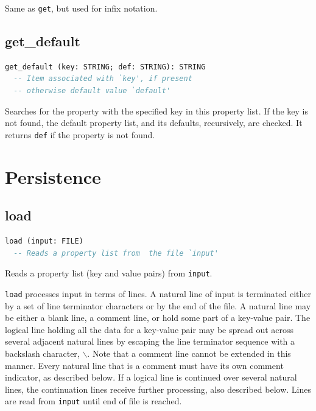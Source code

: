 \documentclass[a4paper,fleqn]{report}
\begin{document}
Same as \texttt{get}, but used for infix notation.


\subsection{get\_default}
\label{sec:get_default}

\begin{lstlisting}[language=Eiffel]
get_default (key: STRING; def: STRING): STRING
  -- Item associated with `key', if present
  -- otherwise default value `default'
\end{lstlisting}

Searches for the property with the specified key in this property
list. If the key is not found, the default property list, and its
defaults, recursively, are checked. It returns \texttt{def} if the
property is not found.


\section{Persistence}
\label{sec:persistence}


\subsection{load}
\label{sec:load}

\begin{lstlisting}[language=Eiffel]
load (input: FILE)
  -- Reads a property list from  the file `input'
\end{lstlisting}

Reads a property list (key and value pairs) from \texttt{input}.

\texttt{load} processes input in terms of lines. A natural line of
input is terminated either by a set of line terminator characters or
by the end of the file. A natural line may be either a blank line, a
comment line, or hold some part of a key-value pair. The logical line
holding all the data for a key-value pair may be spread out across
several adjacent natural lines by escaping the line terminator
sequence with a backslash character, \texttt{$\backslash$}. Note that
a comment line cannot be extended in this manner. Every natural line
that is a comment must have its own comment indicator, as described
below. If a logical line is continued over several natural lines, the
continuation lines receive further processing, also described below.
Lines are read from \texttt{input} until end of file is reached.
\end{document}
